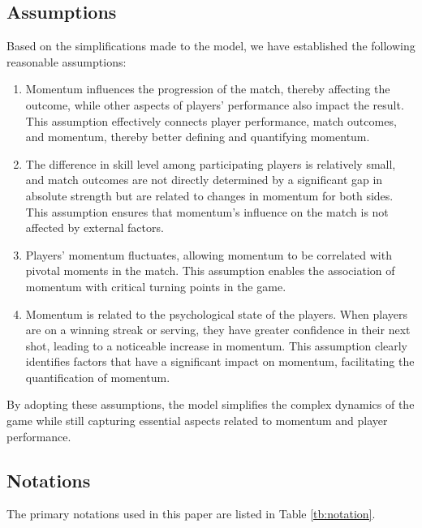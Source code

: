\documentclass[12pt]{article}
\begin{document}
\subsection{Assumptions}
Based on the simplifications made to the model, we have established the following reasonable assumptions:
\begin{enumerate}[\bfseries 1.]
	\item Momentum influences the progression of the match, thereby affecting the outcome, while other aspects of players' performance also impact the result. This assumption effectively connects player performance, match outcomes, and momentum, thereby better defining and quantifying momentum.

	\item The difference in skill level among participating players is relatively small, and match outcomes are not directly determined by a significant gap in absolute strength but are related to changes in momentum for both sides. This assumption ensures that momentum's influence on the match is not affected by external factors.

	\item Players' momentum fluctuates, allowing momentum to be correlated with pivotal moments in the match. This assumption enables the association of momentum with critical turning points in the game.

	\item Momentum is related to the psychological state of the players. When players are on a winning streak or serving, they have greater confidence in their next shot, leading to a noticeable increase in momentum. This assumption clearly identifies factors that have a significant impact on momentum, facilitating the quantification of momentum.
\end {enumerate}

By adopting these assumptions, the model simplifies the complex dynamics of the game while still capturing essential aspects related to momentum and player performance.

\subsection{Notations}
The primary notations used in this paper are listed in Table \ref{tb:notation}.
\end{document}
